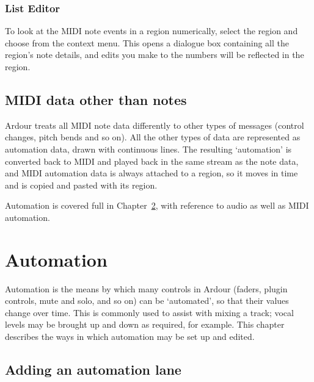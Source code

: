 \documentclass[10pt,a4paper]{book}
\newcommand{\menu}[1]{\emph{\StrSubstitute{#1}{,}{ $\rightarrow$ }}}
\begin{document}
{\subsection{List Editor}

To look at the MIDI note events in a region numerically, select the
region and choose \menu{MIDI,List Editor\ldots} from the context menu.
This opens a dialogue box containing all the region's note details,
and edits you make to the numbers will be reflected in the region.


\section{MIDI data other than notes}
\label{sec:midi-non-note}

Ardour treats all MIDI note data differently to other types of
messages (control changes, pitch bends and so on).  All the other
types of data are represented as automation data, drawn with
continuous lines.  The resulting `automation' is converted back to
MIDI and played back in the same stream as the note data, and MIDI
automation data is always attached to a region, so it moves in time
and is copied and pasted with its region.

Automation is covered full in Chapter~\ref{ch:automation}, with
reference to audio as well as MIDI automation.






\chapter{Automation}
\label{ch:automation}

Automation is the means by which many controls in Ardour (faders,
plugin controls, mute and solo, and so on) can be `automated', so that
their values change over time.  This is commonly used to assist with
mixing a track; vocal levels may be brought up and down as required,
for example.  This chapter describes the ways in which automation may
be set up and edited.

\section{Adding an automation lane}

}
\end{document}
